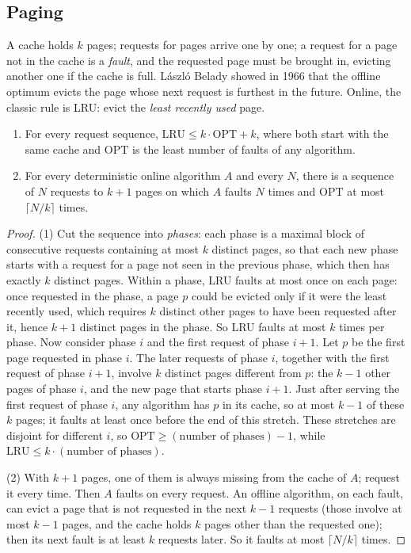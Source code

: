 \subsection*{Paging}

A cache holds $k$ pages; requests for pages arrive one by one; a request for a page not in the cache is a \emph{fault}, and the requested page must be brought in, evicting another one if the cache is full. László Belady showed in 1966 that the offline optimum evicts the page whose next request is furthest in the future. Online, the classic rule is LRU: evict the \emph{least recently used} page.

\begin{theorem}\label{thm:paging}
\begin{enumerate}
\item For every request sequence, $\mathrm{LRU}\le k\cdot\mathrm{OPT}+k$, where both start with the same cache and $\mathrm{OPT}$ is the least number of faults of any algorithm.
\item For every deterministic online algorithm $A$ and every $N$, there is a sequence of $N$ requests to $k+1$ pages on which $A$ faults $N$ times and $\mathrm{OPT}$ at most $\lceil N/k\rceil$ times.
\end{enumerate}
\end{theorem}
\begin{proof}
(1) Cut the sequence into \emph{phases}: each phase is a maximal block of consecutive requests containing at most $k$ distinct pages, so that each new phase starts with a request for a page not seen in the previous phase, which then has exactly $k$ distinct pages. Within a phase, LRU faults at most once on each page: once requested in the phase, a page $p$ could be evicted only if it were the least recently used, which requires $k$ distinct other pages to have been requested after it, hence $k+1$ distinct pages in the phase. So LRU faults at most $k$ times per phase.
Now consider phase $i$ and the first request of phase $i+1$. Let $p$ be the first page requested in phase $i$. The later requests of phase $i$, together with the first request of phase $i+1$, involve $k$ distinct pages different from $p$: the $k-1$ other pages of phase $i$, and the new page that starts phase $i+1$. Just after serving the first request of phase $i$, any algorithm has $p$ in its cache, so at most $k-1$ of these $k$ pages; it faults at least once before the end of this stretch. These stretches are disjoint for different $i$, so $\mathrm{OPT}\ge(\text{number of phases})-1$, while $\mathrm{LRU}\le k\cdot(\text{number of phases})$.

(2) With $k+1$ pages, one of them is always missing from the cache of $A$; request it every time. Then $A$ faults on every request. An offline algorithm, on each fault, can evict a page that is not requested in the next $k-1$ requests (those involve at most $k-1$ pages, and the cache holds $k$ pages other than the requested one); then its next fault is at least $k$ requests later. So it faults at most $\lceil N/k\rceil$ times.
\end{proof}

